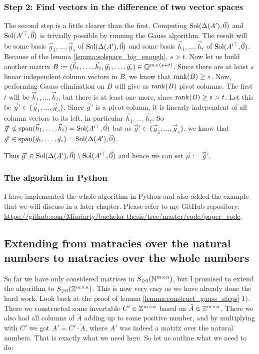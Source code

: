 \subsubsection{Step 2: Find vectors in the difference of two vector spaces}
The second step is a little clearer than the first. Computing $\operatorname{Sol}(\Delta(A'), \vec0)$ and $\operatorname{Sol}(A'^\top, \vec0)$ is trivially possible by running the Gauss algorithm. The result will be some basis $\vec g_{1}, \dots, \vec g_s$ of $\operatorname{Sol}(\Delta(A'), \vec0)$ and some basis $\vec h_1, \dots, \vec h_t$ of $\operatorname{Sol}(A'^\top, \vec0)$. Because of the lemma \ref{lemma:solspace_big_enough}, $s > t$. Now let us build another matrix $B := (\vec h_1, \dots, \vec h_t, \vec g_{1}, \dots, \vec g_s) \in \mathbb{Q}^{m\times(s+t)}$. Since there are at least $s$ linear independent column vectors in $B$, we know that $\operatorname{rank}(B)\geq s$. Now, performing Gauss elimination on $B$ will give us $\operatorname{rank}(B)$ pivot columns. The first $t$ will be $\vec h_1, \dots, \vec h_t$, but there is at least one more, since $\operatorname{rank}(B)\geq s > t$. Let this be $\vec g' \in \{\vec g_{1}, \dots, \vec g_s\}$. Since $\vec g'$ is a pivot column, it is linearly independent of all column vectors to its left, in particular $\vec h_1, \dots, \vec h_t$. So $\vec g' \notin \operatorname{span}(\vec h_1, \dots, \vec h_t) = \operatorname{Sol}(A'^\top, \vec0)$ but as $\vec g' \in \{\vec g_{1}, \dots, \vec g_s\}$, we know that $\vec g' \in \operatorname{span}(\vec g_{1}, \dots, \vec g_s) = \operatorname{Sol}(\Delta(A'), \vec0)$.

Thus $\vec g' \in \operatorname{Sol}(\Delta(A'), \vec0)\setminus\operatorname{Sol}(A'^\top, \vec0)$ and hence we can set $\vec\mu := \vec g'$.

\subsubsection{The algorithm in Python}
I have implemented the whole algorithm in Python and also added the example that we will discuss in a later chapter. Please refer to my GitHub repository: \url{https://github.com/Mioriarty/bachelor-thesis/tree/master/code/paper_code}.

\subsection{Extending from matracies over the natural numbers to matracies over the whole numbers}
So far we have only considered matrices in $S_{\geq 0}(\mathbb{N}^{m \times n})$, but I promised to extend the algorithm to $S_{\geq 0}(\mathbb{Z}^{m \times n})$. This is now very easy as we have already done the hard work. Look back at the proof of lemma \ref{lemma:construct_gauss_steps} 1). There we constructed some invertable $C'\in\mathbb{Z}^{m \times n}$ based on $\tilde A \in \mathbb{Z}^{m \times n}$. There we also had all columns of $\tilde A$ adding up to some positive number, and by multiplying with $C'$ we got $A' = C' \cdot \tilde A$, where $A'$ was indeed a matrix over the natural numbers. That is exactly what we need here. So let us outline what we need to do:

